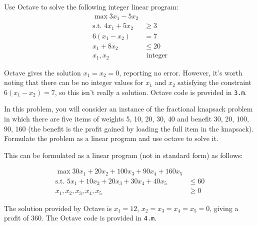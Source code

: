 \documentclass[fleqn]{homework}
\begin{document}
  \begin{problem}{3}
    \begin{question}
      Use Octave to solve the following integer linear program:
      \begin{align*}
        \max 3x_1 - 5x_2 & \\
        \text{s.t.  } 4x_1 + 5x_2 &\ge 3 \\
        6(x_1 - x_2) &= 7 \\
        x_1 + 8x_2 &\le 20 \\
        x_1, x_2 &\text{ integer}
      \end{align*}
    \end{question}

    Octave gives the solution $x_1 = x_2 = 0$, reporting no error.  However,
    it's worth noting that there can be no integer values for $x_1$ and $x_2$
    satisfying the constraint $6(x_1 - x_2) = 7$, so this isn't really a
    solution.  Octave code is provided in \texttt{3.m}.
  \end{problem}

  \begin{problem}{4}
    \begin{question}
      In this problem, you will consider an instance of the fractional knapsack
      problem in which there are five items of weights 5, 10, 20, 30, 40 and
      benefit 30, 20, 100, 90, 160 (the benefit is the profit gained by loading
      the full item in the knapsack).  Formulate the problem as a linear program
      and use octave to solve it.
    \end{question}

    This can be formulated as a linear program (not in standard form) as follows:
    
    \begin{align*}
      \max 30x_1 + 20x_2 + 100x_3 + 90x_4 + 160 x_5 &\\
      \text{s.t. } 5x_1 + 10x_2 + 20 x_3 + 30x_4 + 40x_5 &\leq 60 \\
      x_1, x_2, x_3, x_4, x_5 &\geq 0
    \end{align*}

    The solution provided by Octave is $x_1 = 12$, $x_2 = x_3 = x_4 = x_5 = 0$,
    giving a profit of 360.  The Octave code is provided in \texttt{4.m}.
  \end{problem}
\end{document}

